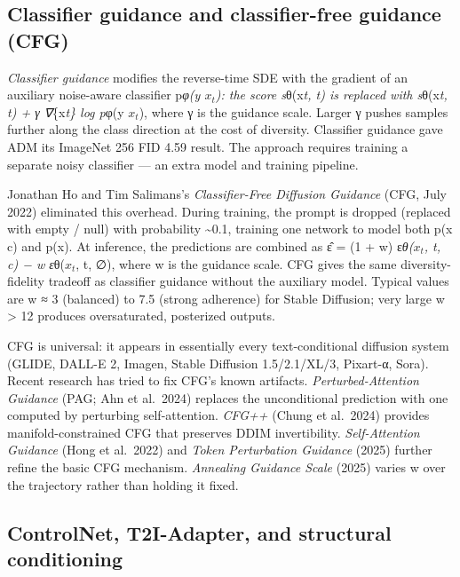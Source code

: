 \documentclass{article}
\begin{document}
\subsection{Classifier guidance and classifier-free guidance (CFG)}\label{classifier-guidance-and-classifier-free-guidance-cfg}

\emph{Classifier guidance} \citep{dhariwal2021diffusionmodelsbea} modifies the reverse-time SDE with the gradient of an auxiliary noise-aware classifier p\emph{φ(y \textbar{} \(x_t\)): the score s}θ(x\emph{t, t) is replaced with s}θ(x\emph{t, t) + γ ∇}\{x\emph{t\} log p}φ(y \textbar{} \(x_t\)), where γ is the guidance scale. Larger γ pushes samples further along the class direction at the cost of diversity. Classifier guidance gave ADM its ImageNet 256 FID 4.59 result. The approach requires training a separate noisy classifier --- an extra model and training pipeline.

Jonathan Ho and Tim Salimans's \emph{Classifier-Free Diffusion Guidance} (CFG, July 2022) eliminated this overhead. During training, the prompt is dropped (replaced with empty / null) with probability \textasciitilde0.1, training one network to model both p(x \textbar{} c) and p(x). At inference, the predictions are combined as ε̂ = (1 + w) ε\emph{θ(\(x_t\), t, c) − w ε}θ(\(x_t\), t, ∅), where w is the guidance scale. CFG gives the same diversity-fidelity tradeoff as classifier guidance without the auxiliary model. Typical values are w ≈ 3 (balanced) to 7.5 (strong adherence) for Stable Diffusion; very large w \textgreater{} 12 produces oversaturated, posterized outputs.

CFG is universal: it appears in essentially every text-conditional diffusion system (GLIDE, DALL-E 2, Imagen, Stable Diffusion 1.5/2.1/XL/3, Pixart-α, Sora). Recent research has tried to fix CFG's known artifacts. \emph{Perturbed-Attention Guidance} (PAG; Ahn et al.~2024) replaces the unconditional prediction with one computed by perturbing self-attention. \emph{CFG++} (Chung et al.~2024) provides manifold-constrained CFG that preserves DDIM invertibility. \emph{Self-Attention Guidance} (Hong et al.~2022) and \emph{Token Perturbation Guidance} (2025) further refine the basic CFG mechanism. \emph{Annealing Guidance Scale} (2025) varies w over the trajectory rather than holding it fixed.

\subsection{ControlNet, T2I-Adapter, and structural conditioning}\label{controlnet-t2i-adapter-and-structural-conditioning}
\end{document}
